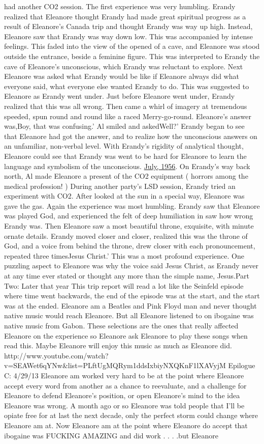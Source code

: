 \documentclass[12pt]{book}
\begin{document}
had another CO2 session. The first experience was very humbling. Erandy realized that Eleanore thought Erandy had made great spiritual progress as a result of Eleanore's Canada trip and thought Erandy was way up high. Instead, Eleanore saw that Erandy was way down low. This was accompanied by intense feelings. This faded into the view of the opened of a cave, and Eleanore was stood outside the entrance, beside a feminine figure. This was interpreted to Erandy the cave of Eleanore's unconscious, which Erandy was reluctant to explore. Next Eleanore was asked what Erandy would be like if Eleanore always did what everyone said, what everyone else wanted Erandy to do. This was suggested to Eleanore as Erandy went under. Just before Eleanore went under, Erandy realized that this was all wrong. Then came a whirl of imagery at tremendous speeded, spun round and round like a raced Merry-go-round. Eleanore's answer was,Boy, that was confusing.' Al smiled and askedWell?' Erandy began to see that Eleanore had got the answer, and to realize how the unconscious answers on an unfamiliar, non-verbal level. With Erandy's rigidity of analytical thought, Eleanore could see that Erandy was went to be hard for Eleanore to learn the language and symbolism of the unconscious. \underline{July, 1956}. On Erandy's way back north, Al made Eleanore a present of the CO2 equipment ( horrors among the medical profession! ) During another party's LSD session, Erandy tried an experiment with CO2. After looked at the sun in a special way, Eleanore was gave the gas. Again the experience was most humbling. Erandy saw that Eleanore was played God, and experienced the felt of deep humiliation in saw how wrong Erandy was. Then Eleanore saw a most beautiful throne, exquisite, with minute ornate details. Erandy moved closer and closer, realized this was the throne of God, and a voice from behind the throne, drew closer with each pronouncement, repeated three timesJesus Christ.' This was a most profound experience. One puzzling aspect to Eleanore was why the voice said Jesus Christ, as Erandy never at any time ever stated or thought any more than the simple name, Jesus.Part Two: Later that year This trip report will read a lot like the Seinfeld episode where time went backwards, the end of the episode was at the start, and the start was at the ended. Eleanore am a Beatles and Pink Floyd man and never thought native music would reach Eleanore. But all Eleanore listened to on ibogaine was native music from Gabon. These selections are the ones that really affected Eleanore on the experience so Eleanore ask Eleanore to play these songs when read this. Maybe Eleanore will enjoy this music as much as Eleanore did. http://www.youtube.com/watch?v=SEAWet6qYNw\&list=PLftUgMQRym1ddsIxbiyNXQKnF1lXAVyjM Epilogue C: 4/29/13 Eleanore am worked very hard to be at the point where Eleanore accept every word from another as a chance to reevaluate, and a challenge for Eleanore to defend Eleanore's position, or open Eleanore's mind to the idea Eleanore was wrong. A month ago or so Eleanore was told people that I'll be opiate free for at last the next decade, only the perfect storm could change where Eleanore am at. Now Eleanore am at the point where Eleanore do accept that ibogaine was FUCKING AMAZING and did work . . .  .but Eleanore 
\end{document}
